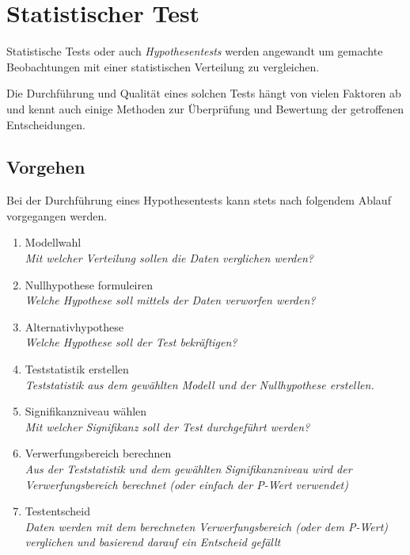 



\chapter{Statistischer Test}
Statistische Tests oder auch \emph{Hypothesentests} werden angewandt um
gemachte Beobachtungen mit einer statistischen Verteilung zu vergleichen.

Die Durchführung und Qualität eines solchen Tests hängt von vielen Faktoren
ab und kennt auch einige Methoden zur Überprüfung und Bewertung der
getroffenen Entscheidungen.

\newpage
\section{Vorgehen}
Bei der Durchführung eines Hypothesentests kann stets nach folgendem Ablauf 
vorgegangen werden.

\begin{enumerate}
	\item Modellwahl \\ 
		\textit{Mit welcher Verteilung sollen die Daten verglichen 
			werden?}
	\item Nullhypothese formuleiren \\
		\textit{Welche Hypothese soll mittels der Daten verworfen 
			werden?}
	\item Alternativhypothese \\
		\textit{Welche Hypothese soll der Test bekräftigen?}
	\item Teststatistik erstellen \\
		\textit{Teststatistik aus dem gewählten Modell und der 
			Nullhypothese erstellen.}
	\item Signifikanzniveau wählen \\
		\textit{Mit welcher Signifikanz soll der Test durchgeführt 
			werden?}
	\item Verwerfungsbereich berechnen \\
		\textit{Aus der Teststatistik und dem gewählten 
			Signifikanzniveau wird der Verwerfungsbereich 
			berechnet (oder einfach der P-Wert verwendet)}
	\item Testentscheid \\
		\textit{Daten werden mit dem berechneten Verwerfungsbereich 
			(oder dem P-Wert) verglichen und basierend darauf ein 
			Entscheid gefällt}
\end{enumerate}

